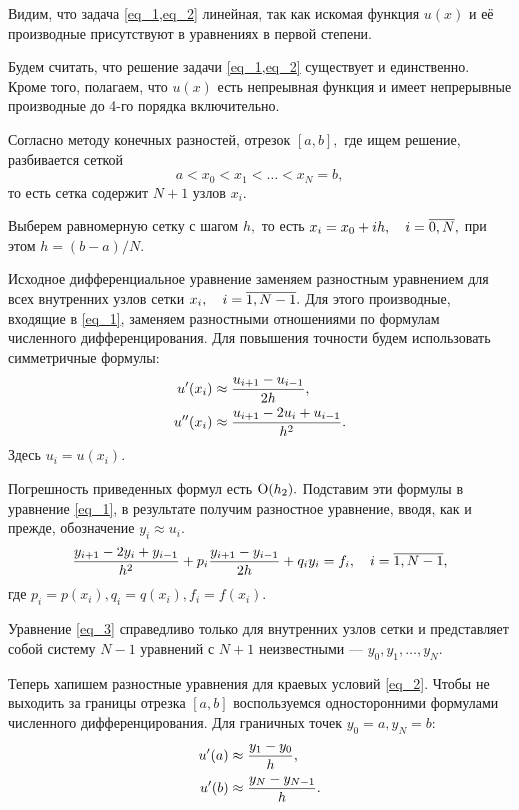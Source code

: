 Видим, что задача \cref{eq_1,eq_2} линейная, так как искомая функция $u(x)$ и её производные присутствуют в уравнениях в первой степени.

Будем считать, что решение задачи \cref{eq_1,eq_2} существует и единственно. Кроме того, полагаем, что $u(x)$ есть непреывная функция и имеет непрерывные производные до 4-го порядка включительно.

Согласно методу конечных разностей, отрезок $[a, b],$ где ищем решение, разбивается сеткой
$$
a<x_0<x_1<\ldots<x_N=b,
$$
то есть сетка содержит $N+1$ узлов $x_i.$

Выберем равномерную сетку с шагом $h,$ то есть $x_i=x_0+ih, \quad i=\overline{0, N},$ при этом $h=(b-a)/N.$

Исходное дифференциальное уравнение заменяем разностным уравнением для всех внутренних узлов сетки $x_i, \quad i=\overline{1,N-1}.$ Для этого производные, входящие в \eqref{eq_1}, заменяем разностными отношениями по формулам численного дифференцирования. Для повышения точности будем использовать симметричные формулы:
\begin{equation*}
\begin{split}
u'(x_i) &\approx \frac{u_{i+1}-u_{i-1}}{2h},\\
u''(x_i) &\approx \frac{u_{i+1}-2u_i+u_{i-1}}{h^2}.
\end{split}
\end{equation*}
Здесь $u_i=u(x_i).$

Погрешность приведенных формул есть $\operatorname{O}(h_2).$ Подставим эти формулы в уравнение \eqref{eq_1}, в результате получим разностное уравнение, вводя, как и прежде, обозначение $y_i \approx u_i.$
\begin{equation}\label{eq_3}
\frac{y_{i+1}-2y_i+y_{i-1}}{h^2} + p_i\frac{y_{i+1}-y_{i-1}}{2h}+q_iy_i = f_i, \quad i=\overline{1, N-1},
\end{equation}
где $p_i = p(x_i), q_i = q(x_i), f_i = f(x_i).$

Уравнение \eqref{eq_3} справедливо только для внутренних узлов сетки и представляет собой систему $N-1$ уравнений с $N+1$ неизвестными --- $y_0, y_1, \ldots, y_N.$

Теперь хапишем разностные уравнения для краевых условий \eqref{eq_2}. Чтобы не выходить за границы отрезка $[a, b]$ воспользуемся односторонними формулами численного дифференцирования. Для граничных точек $y_0 = a, y_N = b:$
\begin{equation*}
\begin{split}
u'(a) &\approx \frac{y_1-y_0}{h},\\
u'(b) &\approx \frac{y_N-y_{N-1}}{h}.
\end{split}
\end{equation*}

